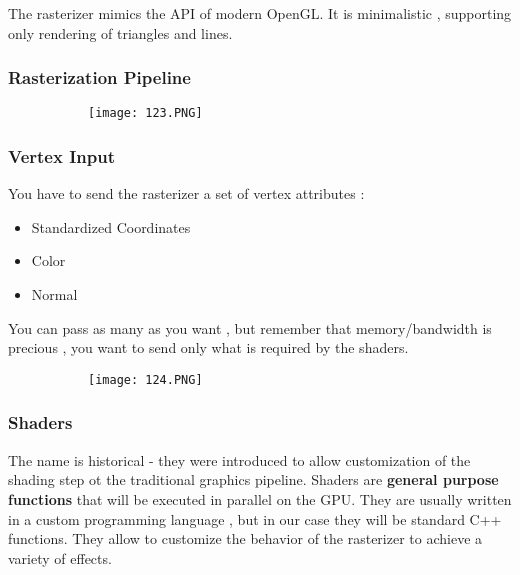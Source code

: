 \documentclass{article}
\begin{document}
The rasterizer mimics the API of modern OpenGL.
It is minimalistic , supporting only rendering of triangles and lines.


\subsubsection{Rasterization Pipeline}

\begin{figure}[ht!]
  \centering
  \begin{subfigure}[b]{0.7\linewidth}
    \texttt{[image: 123.PNG]}
  \end{subfigure}
\end{figure}


\subsubsection{Vertex Input}

You have to send the rasterizer a set of vertex attributes : 

\begin{itemize}
    \item Standardized Coordinates
    \item Color
    \item Normal
\end{itemize}

You can pass as many as you want , but remember that memory/bandwidth is precious , you want to send only what is required by the shaders.


\begin{figure}[ht!]
  \centering
  \begin{subfigure}[b]{0.7\linewidth}
    \texttt{[image: 124.PNG]}
  \end{subfigure}
\end{figure}

\vspace{50mm}

\subsubsection{Shaders}

The name is historical - they were introduced to allow customization of the shading step ot the traditional graphics pipeline.
Shaders are \textbf{general purpose functions} that will be executed in parallel on the GPU.
They are usually written in a custom programming language , but in our case they will be standard C++ functions. They allow to customize the behavior of the rasterizer to achieve a variety of effects.
\end{document}
